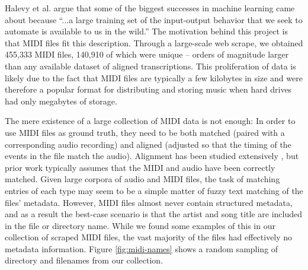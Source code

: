 \documentclass{article}
\begin{document}
Halevy et al. \cite{halevy2009unreasonable} argue that some of the biggest successes in machine learning came about because ``...a large training set of the input-output behavior that we seek to automate is available to us in the wild.''
The motivation behind this project is that MIDI files fit this description.
Through a large-scale web scrape, we obtained 455,333 MIDI files, 140,910 of which were unique -- orders of magnitude larger than any available dataset of aligned transcriptions.
This proliferation of data is likely due to the fact that MIDI files are typically a few kilobytes in size and were therefore a popular format for distributing and storing music when hard drives had only megabytes of storage.


The mere existence of a large collection of MIDI data is not enough:  In order to use MIDI files as ground truth, they need to be both matched (paired with a corresponding audio recording) and aligned (adjusted so that the timing of the events in the file match the audio).
Alignment has been studied extensively  \cite{ewert2012towards, turetsky2003ground}, but prior work typically assumes that the MIDI and audio have been correctly matched.
Given large corpora of audio and MIDI files, the task of matching entries of each type may seem to be a simple matter of fuzzy text matching of the files' metadata.
However, MIDI files almost never contain structured metadata, and as a result the best-case scenario is that the artist and song title are included in the file or directory name.
While we found some examples of this in our collection of scraped MIDI files, the vast majority of the files had effectively no metadata information.
Figure \ref{fig:midi-names} shows a random sampling of directory and filenames from our collection.
\end{document}
